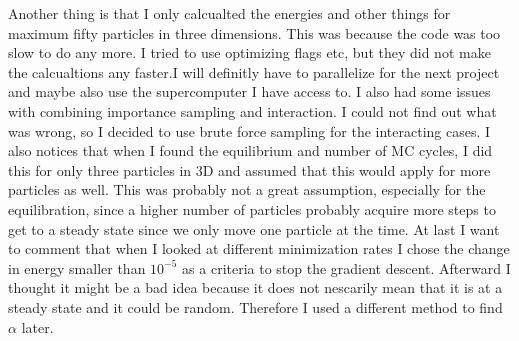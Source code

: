 Another thing is that I only calcualted the energies and other things for maximum fifty particles in three dimensions. This was because the code was too slow to do any more. I tried to use optimizing flags etc, but they did not make the calcualtions any faster.I will definitly have to parallelize for the next project and maybe also use the supercomputer I have access to. I also had some issues with combining importance sampling and interaction. I could not find out what was wrong, so I decided to use brute force sampling for the interacting cases.
I also notices that when I found the equilibrium and number of MC cycles, I did this for only three particles in 3D and assumed that this would apply for more particles as well. This was probably not a great assumption, especially for the equilibration, since a higher number of particles probably acquire more steps to get to a steady state since we only move one particle at the time. At last I want to comment that when I looked at different minimization rates I chose the change in energy smaller than $10^{-5}$ as a criteria to stop the gradient descent. Afterward I thought it might be a bad idea because it does not nescarily mean that it is at a steady state and it could be random. Therefore I used a  different method to find $\alpha$ later.


